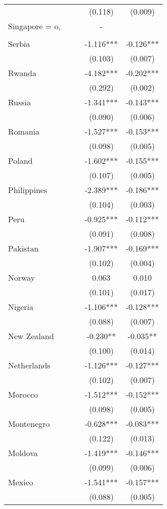 \documentclass[]{article}
\begin{document}
\begin{tabular}{lcccc}
 &  &  & (0.118) & (0.009) \\
Singapore = o, &  &  & - &  \\
 &  &  &  &  \\
Serbia &  &  & -1.116*** & -0.126*** \\
 &  &  & (0.103) & (0.007) \\
Rwanda &  &  & -4.182*** & -0.202*** \\
 &  &  & (0.292) & (0.002) \\
Russia &  &  & -1.341*** & -0.143*** \\
 &  &  & (0.090) & (0.006) \\
Romania &  &  & -1.527*** & -0.153*** \\
 &  &  & (0.098) & (0.005) \\
Poland &  &  & -1.602*** & -0.155*** \\
 &  &  & (0.107) & (0.005) \\
Philippines &  &  & -2.389*** & -0.186*** \\
 &  &  & (0.104) & (0.003) \\
Peru &  &  & -0.925*** & -0.112*** \\
 &  &  & (0.091) & (0.008) \\
Pakistan &  &  & -1.907*** & -0.169*** \\
 &  &  & (0.102) & (0.004) \\
Norway &  &  & 0.063 & 0.010 \\
 &  &  & (0.101) & (0.017) \\
Nigeria &  &  & -1.106*** & -0.128*** \\
 &  &  & (0.088) & (0.007) \\
New Zealand &  &  & -0.230** & -0.035** \\
 &  &  & (0.100) & (0.014) \\
Netherlands &  &  & -1.126*** & -0.127*** \\
 &  &  & (0.102) & (0.007) \\
Morocco &  &  & -1.512*** & -0.152*** \\
 &  &  & (0.098) & (0.005) \\
Montenegro &  &  & -0.628*** & -0.083*** \\
 &  &  & (0.122) & (0.013) \\
Moldova &  &  & -1.419*** & -0.146*** \\
 &  &  & (0.099) & (0.006) \\
Mexico &  &  & -1.541*** & -0.157*** \\
 &  &  & (0.088) & (0.005) \\

\end{tabular}
\end{document}
